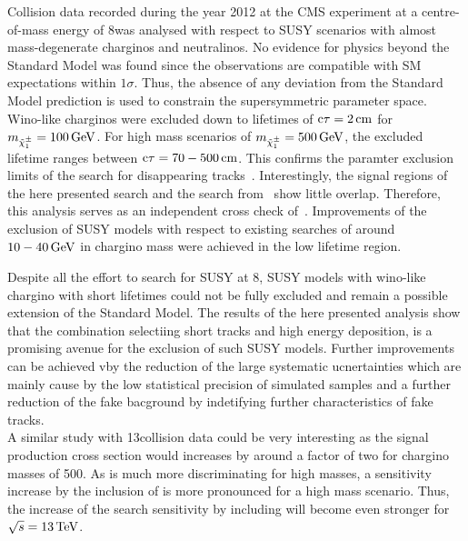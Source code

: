 Collision data recorded during the year 2012 at the CMS experiment at a centre-of-mass energy of 8\tev was analysed with respect to SUSY scenarios with almost mass-degenerate charginos and neutralinos.
No evidence for physics beyond the Standard Model was found since the observations are compatible with SM expectations within $1\sigma$.
Thus, the absence of any deviation from the Standard Model prediction is used to constrain the supersymmetric parameter space.
Wino-like charginos were excluded down to lifetimes of $\text{c}\tau=2\,\text{cm}$ for $m_{\tilde{\chi}^{\pm}_{1}}=100\,\text{Ge}\kern-0.06667em\text{V}$.
For high mass scenarios of $m_{\tilde{\chi}^{\pm}_{1}}=500\,\text{Ge}\kern-0.06667em\text{V}$, the excluded lifetime ranges between $\text{c}\tau=70-500\,\text{cm}$.
This confirms the paramter exclusion limits of the search for disappearing tracks~\cite{bib:CMS:DT_8TeV}.
Interestingly, the signal regions of the here presented search and the search from~\cite{bib:CMS:DT_8TeV} show little overlap.
Therefore, this analysis serves as an independent cross check of~\cite{bib:CMS:DT_8TeV}.
Improvements of the exclusion of SUSY models with respect to existing searches of around $10-40\,\text{Ge}\kern-0.06667em\text{V}$ in chargino mass were achieved in the low lifetime region.

Despite all the effort to search for SUSY at 8\tev, SUSY models with wino-like chargino with short lifetimes could not be fully excluded and remain a possible extension of the Standard Model.
The results of the here presented analysis show that the combination selectiing short tracks and high energy deposition, is a promising avenue for the exclusion of such SUSY models.
Further improvements can be achieved vby the reduction of the large systematic ucnertainties which are mainly cause by the low statistical precision of simulated samples and a further reduction of the fake bacground by indetifying further characteristics of fake tracks.
\\


A similar study with 13\tev collision data could be very interesting as the signal production cross section would increases by around a factor of two for chargino masses of 500\gev.
As \ias is much more discriminating for high masses, a sensitivity increase by the inclusion of \ias is more pronounced for a high mass scenario.
Thus, the increase of the search sensitivity by including \ias will become even stronger for $\sqrt{s} = 13\,\text{Te}\kern-0.06667em\text{V}$.


